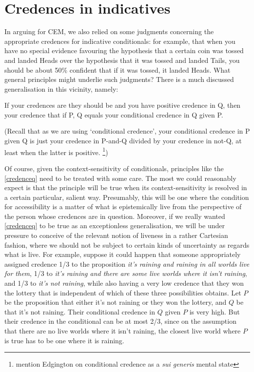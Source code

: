 \documentclass[If.tex]{subfiles}
\begin{document}
\section{Credences in indicatives}
In arguing for CEM, we also relied on some judgments concerning the appropriate credences for indicative conditionals: for example, that when you have no special evidence favouring the hypothesis that a certain coin was tossed and landed Heads over the hypothesis that it was tossed and landed Tails, you should be about 50\% confident that if it was tossed, it landed Heads.  What general principles might underlie such judgments?  There is a much discussed generalisation in this vicinity, namely:
\begin{prop}
	 \label{credenceq}
	If your credences are they should be and you have positive credence in Q, then your credence that if P, Q equals your conditional credence in Q given P. 
\end{prop}
(Recall that as we are using ‘conditional credence’, your conditional credence in P given Q is just your credence in P-and-Q divided by your credence in not-Q, at least when the latter is positive.%
\footnote{mention Edgington on conditional credence as a \emph{sui generis} mental state})

Of course, given the context-sensitivity of conditionals, principles like the \ref{credenceq} need to be treated with some care. The most we could reasonably expect is that the principle will be true when its context-sensitivity is resolved in a certain particular, salient way.  Presumably, this will be one where the condition for accessibility is a matter of what is epistemically live from the perspective of the person whose credences are in question.  Moreover, if we really wanted \ref{credenceq} to be true as an exceptionless generalisation, we will be under pressure to conceive of the relevant notion of liveness in a rather Cartesian fashion, where we should not be subject to certain kinds of uncertainty as regards what is live.  For example, suppose it could happen that someone appropriately assigned credence 1/3 to the proposition \emph{it's raining and raining in all worlds live for them}, 1/3 to \emph{it's raining and there are some live worlds where it isn't raining}, and 1/3 to \emph{it's not raining}, while also having a very low credence that they won the lottery that is independent of which of these three possibilities obtains.  Let $P$ be the proposition that either it's not raining or they won the lottery, and $Q$ be that it's not raining.  Their conditional credence in $Q$ given $P$ is very high.  But their credence in the conditional can be at most 2/3, since on the assumption that there are no live worlds where it isn't raining, the closest live world where $P$ is true has to be one where it is raining.
\end{document}
